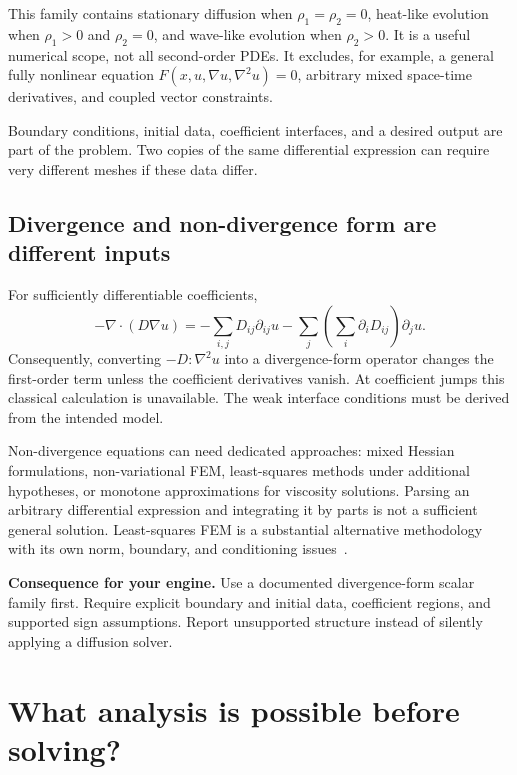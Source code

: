 \documentclass[11pt,a4paper]{article}
\newcommand{\decision}[1]{\par\smallskip\noindent\textcolor{accent}{\textbf{Consequence for your engine.}} #1\par}
\begin{document}
This family contains stationary diffusion when $\rho_1=\rho_2=0$, heat-like evolution when $\rho_1>0$ and $\rho_2=0$, and wave-like evolution when $\rho_2>0$. It is a useful numerical scope, not all second-order PDEs. It excludes, for example, a general fully nonlinear equation $F(x,u,\nabla u,\nabla^2u)=0$, arbitrary mixed space-time derivatives, and coupled vector constraints.

Boundary conditions, initial data, coefficient interfaces, and a desired output are part of the problem. Two copies of the same differential expression can require very different meshes if these data differ.

\subsection{Divergence and non-divergence form are different inputs}
For sufficiently differentiable coefficients,
\begin{equation}
-\nabla\cdot(D\nabla u)
=-\sum_{i,j}D_{ij}\partial_{ij}u
-\sum_j\left(\sum_i\partial_iD_{ij}\right)\partial_j u.
\end{equation}
Consequently, converting $-D:\nabla^2u$ into a divergence-form operator changes the first-order term unless the coefficient derivatives vanish. At coefficient jumps this classical calculation is unavailable. The weak interface conditions must be derived from the intended model.

Non-divergence equations can need dedicated approaches: mixed Hessian formulations, non-variational FEM, least-squares methods under additional hypotheses, or monotone approximations for viscosity solutions. Parsing an arbitrary differential expression and integrating it by parts is not a sufficient general solution. Least-squares FEM is a substantial alternative methodology with its own norm, boundary, and conditioning issues~\cite{bochev}.

\decision{Use a documented divergence-form scalar family first. Require explicit boundary and initial data, coefficient regions, and supported sign assumptions. Report unsupported structure instead of silently applying a diffusion solver.}

\section{What analysis is possible before solving?}\label{sec:analysis}
\end{document}

